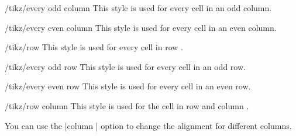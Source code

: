 \begin{stylekey}{/tikz/every odd column}
  This style is used for every cell in an odd column.
\end{stylekey}

\begin{stylekey}{/tikz/every even column}
  This style is used for every cell in an even column.
\end{stylekey}

\begin{stylekey}{/tikz/row }
  This style is used for every cell in row .
\end{stylekey}

\begin{stylekey}{/tikz/every odd row}
  This style is used for every cell in an odd row.
\end{stylekey}

\begin{stylekey}{/tikz/every even row}
  This style is used for every cell in an even row.
\end{stylekey}

\begin{stylekey}{/tikz/row  column }
  This style is used for the cell in row  and column
  .
\end{stylekey}


\begin{codeexample}[]
\end{codeexample}

You can use the |column | option to change the alignment
for different columns.

\begin{codeexample}[]
\end{codeexample}


